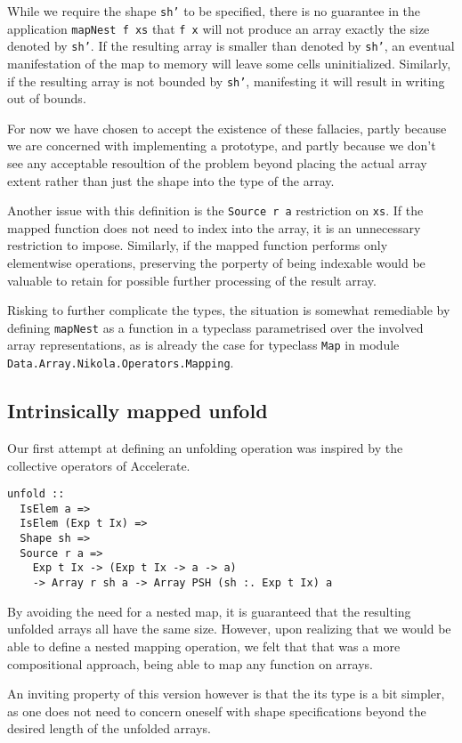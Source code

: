While we require the shape \texttt{sh'} to be specified, there is no guarantee
in the application \texttt{mapNest f xs} that \texttt{f x} will not produce an
array exactly the size denoted by \texttt{sh'}. If the resulting array is
smaller than denoted by \texttt{sh'}, an eventual manifestation of the map to
memory will leave some cells uninitialized. Similarly, if the resulting array
is not bounded by \texttt{sh'}, manifesting it will result in writing out of
bounds.

For now we have chosen to accept the existence of these fallacies, partly
because we are concerned with implementing a prototype, and partly because we
don't see any acceptable resoultion of the problem beyond placing the actual
array extent rather than just the shape into the type of the array.

Another issue with this definition is the \texttt{Source r a} restriction on
\texttt{xs}. If the mapped function does not need to index into the array, it
is an unnecessary restriction to impose.  Similarly, if the mapped function
performs only elementwise operations, preserving the porperty of being
indexable would be valuable to retain for possible further processing of the
result array.

Risking to further complicate the types, the situation is somewhat remediable
by defining \texttt{mapNest} as a function in a typeclass parametrised over the
involved array representations, as is already the case for typeclass
\texttt{Map} in module \texttt{Data.Array.Nikola.Operators.Mapping}.

\subsection{Intrinsically mapped unfold}

Our first attempt at defining an unfolding operation was inspired by the
collective operators of Accelerate.

\begin{verbatim}
unfold ::
  IsElem a =>
  IsElem (Exp t Ix) =>
  Shape sh =>
  Source r a =>
    Exp t Ix -> (Exp t Ix -> a -> a)
    -> Array r sh a -> Array PSH (sh :. Exp t Ix) a
\end{verbatim}

By avoiding the need for a nested map, it is guaranteed that the resulting
unfolded arrays all have the same size. However, upon realizing that we would
be able to define a nested mapping operation, we felt that that was a more
compositional approach, being able to map any function on arrays.

An inviting property of this version however is that the its type is a bit
simpler, as one does not need to concern oneself with shape specifications
beyond the desired length of the unfolded arrays.

